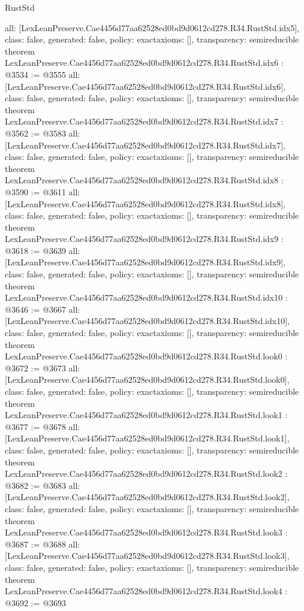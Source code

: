 \begin{lexlean}{RustStd}
\begin{coremodule}
{  all: [LexLeanPreserve.Cae4456d77aa62528ed0bd9d0612cd278.R34.RustStd.idx5],
  class: false,
  generated: false,
  policy: exact{axioms: []},
  transparency: semireducible
}
theorem LexLeanPreserve.Cae4456d77aa62528ed0bd9d0612cd278.R34.RustStd.idx6 : @3534 := @3555 {
  all: [LexLeanPreserve.Cae4456d77aa62528ed0bd9d0612cd278.R34.RustStd.idx6],
  class: false,
  generated: false,
  policy: exact{axioms: []},
  transparency: semireducible
}
theorem LexLeanPreserve.Cae4456d77aa62528ed0bd9d0612cd278.R34.RustStd.idx7 : @3562 := @3583 {
  all: [LexLeanPreserve.Cae4456d77aa62528ed0bd9d0612cd278.R34.RustStd.idx7],
  class: false,
  generated: false,
  policy: exact{axioms: []},
  transparency: semireducible
}
theorem LexLeanPreserve.Cae4456d77aa62528ed0bd9d0612cd278.R34.RustStd.idx8 : @3590 := @3611 {
  all: [LexLeanPreserve.Cae4456d77aa62528ed0bd9d0612cd278.R34.RustStd.idx8],
  class: false,
  generated: false,
  policy: exact{axioms: []},
  transparency: semireducible
}
theorem LexLeanPreserve.Cae4456d77aa62528ed0bd9d0612cd278.R34.RustStd.idx9 : @3618 := @3639 {
  all: [LexLeanPreserve.Cae4456d77aa62528ed0bd9d0612cd278.R34.RustStd.idx9],
  class: false,
  generated: false,
  policy: exact{axioms: []},
  transparency: semireducible
}
theorem LexLeanPreserve.Cae4456d77aa62528ed0bd9d0612cd278.R34.RustStd.idx10 : @3646 := @3667 {
  all: [LexLeanPreserve.Cae4456d77aa62528ed0bd9d0612cd278.R34.RustStd.idx10],
  class: false,
  generated: false,
  policy: exact{axioms: []},
  transparency: semireducible
}
theorem LexLeanPreserve.Cae4456d77aa62528ed0bd9d0612cd278.R34.RustStd.look0 : @3672 := @3673 {
  all: [LexLeanPreserve.Cae4456d77aa62528ed0bd9d0612cd278.R34.RustStd.look0],
  class: false,
  generated: false,
  policy: exact{axioms: []},
  transparency: semireducible
}
theorem LexLeanPreserve.Cae4456d77aa62528ed0bd9d0612cd278.R34.RustStd.look1 : @3677 := @3678 {
  all: [LexLeanPreserve.Cae4456d77aa62528ed0bd9d0612cd278.R34.RustStd.look1],
  class: false,
  generated: false,
  policy: exact{axioms: []},
  transparency: semireducible
}
theorem LexLeanPreserve.Cae4456d77aa62528ed0bd9d0612cd278.R34.RustStd.look2 : @3682 := @3683 {
  all: [LexLeanPreserve.Cae4456d77aa62528ed0bd9d0612cd278.R34.RustStd.look2],
  class: false,
  generated: false,
  policy: exact{axioms: []},
  transparency: semireducible
}
theorem LexLeanPreserve.Cae4456d77aa62528ed0bd9d0612cd278.R34.RustStd.look3 : @3687 := @3688 {
  all: [LexLeanPreserve.Cae4456d77aa62528ed0bd9d0612cd278.R34.RustStd.look3],
  class: false,
  generated: false,
  policy: exact{axioms: []},
  transparency: semireducible
}
theorem LexLeanPreserve.Cae4456d77aa62528ed0bd9d0612cd278.R34.RustStd.look4 : @3692 := @3693 {
}
\end{coremodule}
\end{lexlean}
